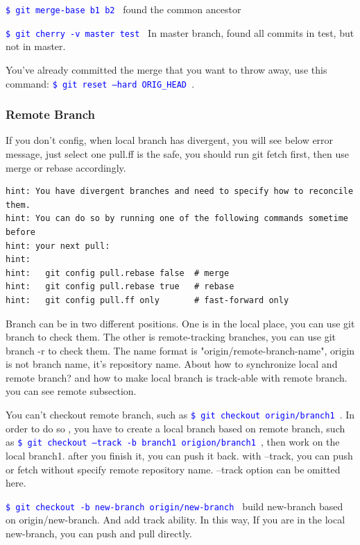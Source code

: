\documentclass[paper=8.5in:11in, twoside, 12pt, pagesize=pdftex]{book}
\newcommand{\linuxcommand}[1]{\texttt{\textcolor{blue}{\$ #1 \Pisymbol{psy}{191}}}}
\begin{document}
	
	\linuxcommand{git merge-base b1 b2}  found the common ancestor
	
	\linuxcommand{git cherry -v master test}  In master branch, found all commits in test, but not in master.
	
	You've already committed the merge that you want to throw away, use this command: \linuxcommand{git reset --hard ORIG\_HEAD}.
	
	

\subsubsection{Remote Branch}
If you don't config, when local branch has divergent, you will see below error message, just select one pull.ff is the safe,  you should run git fetch first, then use merge or rebase accordingly.
\begin{lstlisting}
hint: You have divergent branches and need to specify how to reconcile them.
hint: You can do so by running one of the following commands sometime before
hint: your next pull:
hint: 
hint:   git config pull.rebase false  # merge
hint:   git config pull.rebase true   # rebase
hint:   git config pull.ff only       # fast-forward only
\end{lstlisting}

	 Branch can be in two different positions. One is in the local place, you can use git branch to check them. The other is remote-tracking branches, you can use git branch -r to check them. The name format is "origin/remote-branch-name", origin is not branch name, it's repository name. About how to synchronize local and remote branch? and how to make local branch is track-able with remote branch. you can see remote subsection.
	
	You can't checkout remote branch, such as \linuxcommand{git checkout origin/branch1}. In order to do so , you have to create a local branch based on remote branch, such as \linuxcommand{git checkout --track -b branch1 origion/branch1}, then work on the local branch1. after you finish it, you can push it back. with --track, you can push or fetch without specify remote repository name. --track option can be omitted here. 
	
	\linuxcommand{git checkout -b new-branch origin/new-branch} build new-branch based on origin/new-branch. And add track ability.  In this way, If you are in the local new-branch, you can push and pull directly. 
\end{document}
